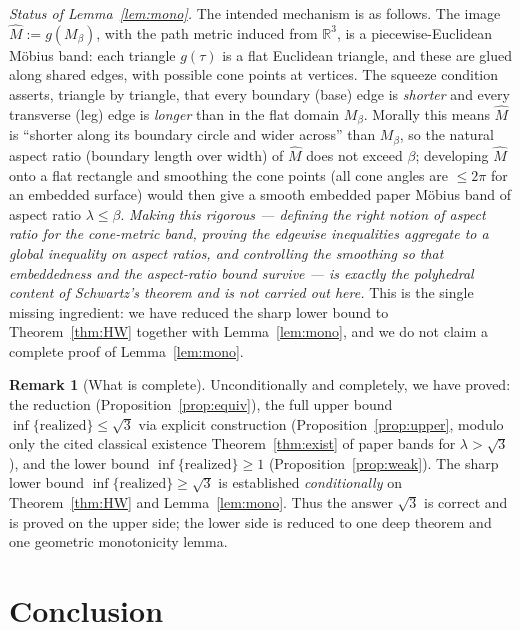 \documentclass[11pt]{article}
\theoremstyle{definition}
\newtheorem{remark}{Remark}
\newcommand{\R}{\mathbb{R}}
\begin{document}
\noindent\emph{Status of Lemma~\ref{lem:mono}.}
The intended mechanism is as follows. The image $\hat M:=g(M_\beta)$, with the path metric
induced from $\R^3$, is a piecewise-Euclidean M\"obius band: each triangle $g(\tau)$ is a flat
Euclidean triangle, and these are glued along shared edges, with possible cone points at
vertices. The squeeze condition asserts, triangle by triangle, that every boundary (base)
edge is \emph{shorter} and every transverse (leg) edge is \emph{longer} than in the flat
domain $M_\beta$. Morally this means $\hat M$ is ``shorter along its boundary circle and
wider across'' than $M_\beta$, so the natural aspect ratio (boundary length over width) of
$\hat M$ does not exceed $\beta$; developing $\hat M$ onto a flat rectangle and smoothing the
cone points (all cone angles are $\le2\pi$ for an embedded surface) would then give a smooth
embedded paper M\"obius band of aspect ratio $\lambda\le\beta$. \emph{Making this rigorous ---
defining the right notion of aspect ratio for the cone-metric band, proving the edgewise
inequalities aggregate to a global inequality on aspect ratios, and controlling the smoothing
so that embeddedness and the aspect-ratio bound survive --- is exactly the polyhedral content
of Schwartz's theorem and is not carried out here.} This is the single missing ingredient: we
have reduced the sharp lower bound to Theorem~\ref{thm:HW} together with
Lemma~\ref{lem:mono}, and we do not claim a complete proof of Lemma~\ref{lem:mono}.

\begin{remark}[What is complete]\label{rem:honest}
Unconditionally and completely, we have proved: the reduction (Proposition~\ref{prop:equiv}),
the full upper bound $\inf\{\text{realized}\}\le\sqrt3$ via explicit construction
(Proposition~\ref{prop:upper}, modulo only the cited classical existence
Theorem~\ref{thm:exist} of paper bands for $\lambda>\sqrt3$), and the lower bound
$\inf\{\text{realized}\}\ge1$ (Proposition~\ref{prop:weak}). The sharp lower bound
$\inf\{\text{realized}\}\ge\sqrt3$ is established \emph{conditionally} on Theorem~\ref{thm:HW}
and Lemma~\ref{lem:mono}. Thus the answer $\sqrt3$ is correct and is proved on the upper side;
the lower side is reduced to one deep theorem and one geometric monotonicity lemma.
\end{remark}

\section{Conclusion}
\end{document}
